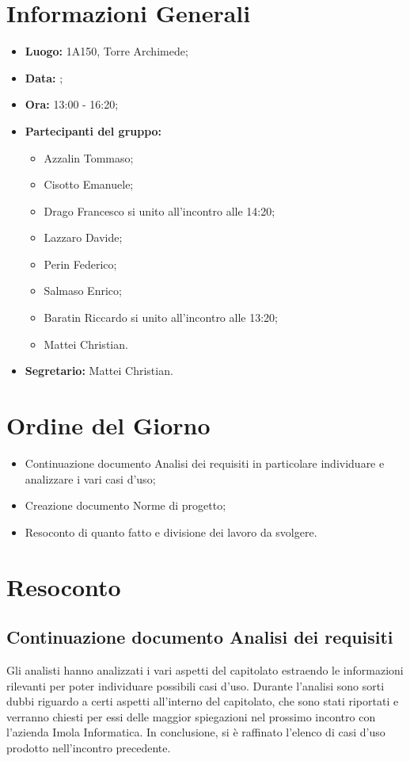 \section{Informazioni Generali}
\begin{itemize}
\item \textbf{Luogo:} 1A150, Torre Archimede;
\item \textbf{Data:} \Data;
\item \textbf{Ora:} 13:00 - 16:20;
\item \textbf{Partecipanti del gruppo:}
	\begin{itemize}
	\item Azzalin Tommaso; 
	\item Cisotto Emanuele; 
	\item Drago Francesco si unito all'incontro alle 14:20;
	\item Lazzaro Davide;
	\item Perin Federico;
	\item Salmaso Enrico;
	\item Baratin Riccardo si unito all'incontro alle 13:20;
	\item Mattei Christian.
	\end{itemize} 
\item \textbf{Segretario:} Mattei Christian.
\end{itemize}

\clearpage

\section{Ordine del Giorno}
\begin{itemize}
	\item Continuazione documento Analisi dei requisiti in particolare individuare e analizzare i vari casi d'uso;
	\item Creazione documento Norme di progetto;
	\item Resoconto di quanto fatto e divisione dei lavoro da svolgere.
\end{itemize}

\clearpage

\section{Resoconto}
\subsection{Continuazione documento Analisi dei requisiti}
Gli analisti hanno analizzati i vari aspetti del capitolato estraendo le informazioni rilevanti per poter individuare possibili casi d’uso. Durante l’analisi sono sorti dubbi riguardo a certi aspetti all’interno del capitolato, che sono stati riportati e verranno chiesti per essi delle maggior spiegazioni nel prossimo incontro con l’azienda Imola Informatica. In conclusione, si è raffinato l’elenco di casi d’uso prodotto nell’incontro precedente.\\

